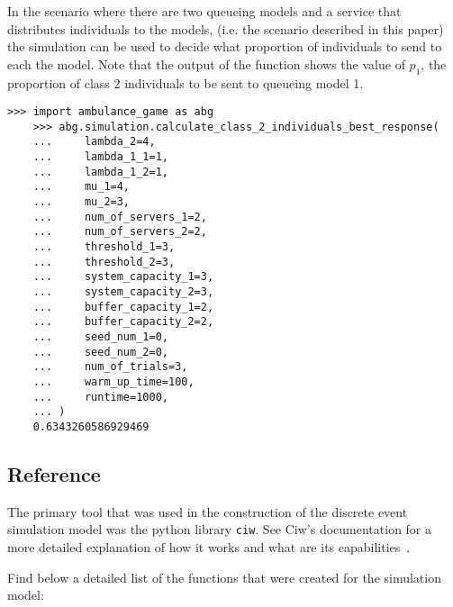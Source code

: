 In the scenario where there are two queueing models and a service that 
distributes individuals to the models, (i.e. the scenario described in this 
paper) the simulation can be used to decide what proportion of individuals 
to send to each the model.
Note that the output of the function shows the value of \(p_1\), the proportion
of class 2 individuals to be sent to queueing model 1. 

\begin{lstlisting}[style=pystyle]
    >>> import ambulance_game as abg
    >>> abg.simulation.calculate_class_2_individuals_best_response(
    ...     lambda_2=4,
    ...     lambda_1_1=1,
    ...     lambda_1_2=1,
    ...     mu_1=4,
    ...     mu_2=3,
    ...     num_of_servers_1=2,
    ...     num_of_servers_2=2,
    ...     threshold_1=3,
    ...     threshold_2=3,
    ...     system_capacity_1=3,
    ...     system_capacity_2=3,
    ...     buffer_capacity_1=2,
    ...     buffer_capacity_2=2,
    ...     seed_num_1=0,
    ...     seed_num_2=0,
    ...     num_of_trials=3,
    ...     warm_up_time=100,
    ...     runtime=1000,
    ... )
    0.6343260586929469

\end{lstlisting}


\subsection{Reference}
The primary tool that was used in the construction of the discrete event 
simulation model was the python library \texttt{ciw}.
See Ciw's documentation for a more detailed explanation of how it works and 
what are its capabilities~\cite{ciwpython}.

Find below a detailed list of the functions that were created for the simulation
model:

